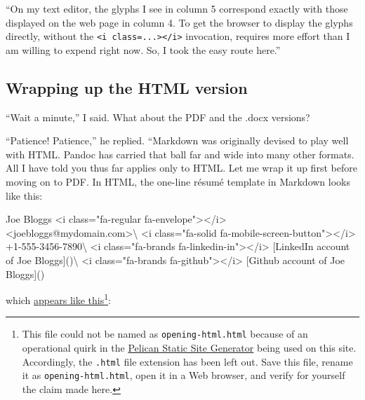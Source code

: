\documentclass[
  british,
  a4paper,
  rgb,
  dvipsnames,
  svgnames,
  hyphens]{article}
\newenvironment{Shaded}{\begin{snugshade}}{\end{snugshade}}
\newcommand{\ErrorTok}[1]{\textcolor[rgb]{0.76,0.75,0.62}{#1}}
\newcommand{\KeywordTok}[1]{\textcolor[rgb]{0.94,0.87,0.69}{#1}}
\newcommand{\NormalTok}[1]{\textcolor[rgb]{0.80,0.80,0.80}{#1}}
\newcommand{\OtherTok}[1]{\textcolor[rgb]{0.94,0.94,0.56}{#1}}
\newcommand{\StringTok}[1]{\textcolor[rgb]{0.80,0.58,0.58}{#1}}
\begin{document}
``On my text editor, the glyphs I see in column 5 correspond exactly
with those displayed on the web page in column 4. To get the browser to
display the glyphs directly, without the
\texttt{\textless{}i\ class=...\textgreater{}\textless{}/i\textgreater{}}
invocation, requires more effort than I am willing to expend right now.
So, I took the easy route here.''  \normalfont

\hypertarget{wrapping-up-the-html-version}{%
\subsection{Wrapping up the HTML
version}\label{wrapping-up-the-html-version}}

``Wait a minute,'' I said. What about the PDF and the .docx versions?

``Patience! Patience,'' he replied. ``Markdown was originally devised to
play well with HTML. Pandoc has carried that ball far and wide into many
other formats. All I have told you thus far applies only to HTML. Let me
wrap it up first before moving on to PDF. In HTML, the one-line résumé
template in Markdown looks like this:

\begin{Shaded}
\begin{Highlighting}[]
\NormalTok{Joe Bloggs}
\KeywordTok{\textless{}i} \ErrorTok{class}\OtherTok{=}\StringTok{"fa{-}regular fa{-}envelope"}\KeywordTok{\textgreater{}\textless{}/i\textgreater{}} \KeywordTok{\textless{}joebloggs}\ErrorTok{@mydomain.com}\KeywordTok{\textgreater{}}\NormalTok{\textbackslash{}}
\KeywordTok{\textless{}i} \ErrorTok{class}\OtherTok{=}\StringTok{"fa{-}solid fa{-}mobile{-}screen{-}button"}\KeywordTok{\textgreater{}\textless{}/i\textgreater{}}\NormalTok{ +1{-}555{-}3456{-}7890\textbackslash{}}
\KeywordTok{\textless{}i} \ErrorTok{class}\OtherTok{=}\StringTok{"fa{-}brands fa{-}linkedin{-}in"}\KeywordTok{\textgreater{}\textless{}/i\textgreater{}}\NormalTok{ [LinkedIn account of Joe Bloggs]()\textbackslash{}}
\KeywordTok{\textless{}i} \ErrorTok{class}\OtherTok{=}\StringTok{"fa{-}brands fa{-}github"}\KeywordTok{\textgreater{}\textless{}/i\textgreater{}}\NormalTok{ [Github account of Joe Bloggs]()}
\end{Highlighting}
\end{Shaded}

which \href{auxiliary/opening-html}{appears like this}\footnote{This
  file could not be named as \texttt{opening-html.html} because of an
  operational quirk in the \href{https://blog.getpelican.com/}{Pelican
  Static Site Generator} being used on this site. Accordingly, the
  \texttt{.html} file extension has been left out. Save this file,
  rename it as \texttt{opening-html.html}, open it in a Web browser, and
  verify for yourself the claim made here.}:
\end{document}
